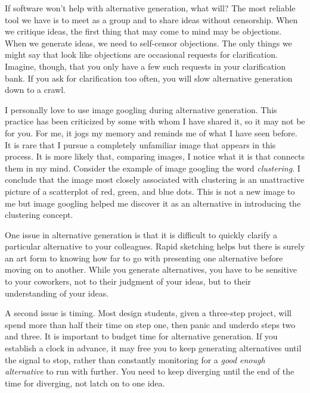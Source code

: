 If software won't help with alternative generation, what will? The most
reliable tool we have is to meet as a group and to share ideas without
censorship. When we critique ideas, the first thing that may come to
mind may be objections. When we generate ideas, we need to self-censor
objections. The only things we might say that look like objections are
occasional requests for clarification. Imagine, though, that you only
have a few such requests in your clarification bank. If you ask for
clarification too often, you will slow alternative generation down to a
crawl.

I personally love to use image googling during alternative generation.
This practice has been criticized by some with whom I have shared it, so
it may not be for you. For me, it jogs my memory and reminds me of what
I have seen before. It is rare that I pursue a completely unfamiliar
image that appears in this process. It is more likely that, comparing
images, I notice what it is that connects them in my mind. Consider the
example of image googling the word \emph{clustering}. I conclude that
the image most closely associated with clustering is an unattractive
picture of a scatterplot of red, green, and blue dots. This is not a new
image to me but image googling helped me discover it as an alternative
in introducing the clustering concept.

One issue in alternative generation is that it is difficult to quickly
clarify a particular alternative to your colleagues. Rapid sketching
helps but there is surely an art form to knowing how far to go with
presenting one alternative before moving on to another. While you
generate alternatives, you have to be sensitive to your coworkers, not
to their judgment of your ideas, but to their understanding of your
ideas.

A second issue is timing. Most design students, given a three-step
project, will spend more than half their time on step one, then panic
and underdo steps two and three. It is important to budget time for
alternative generation. If you establish a clock in advance, it may free
you to keep generating alternatives until the signal to stop, rather
than constantly monitoring for a \emph{good enough alternative} to run
with further. You need to keep diverging until the end of the time for
diverging, not latch on to one idea.

\hypertarget{choices-reflecting-constraints}{%
\label{choices-reflecting-constraints}}

